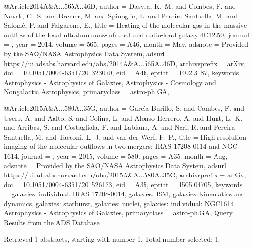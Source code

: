 \documentclass[longauth]{aa}
\begin{document}
{{{{@Article{2014A&A...565A..46D,
  author        = {{Dasyra}, K.~M. and {Combes}, F. and {Novak}, G.~S. and {Bremer}, M. and {Spinoglio}, L. and {Pereira Santaella}, M. and {Salom{\'e}}, P. and {Falgarone}, E.},
  title         = {Heating of the molecular gas in the massive outflow of the local ultraluminous-infrared and radio-loud galaxy 4C12.50},
  journal       = {\aap},
  year          = {2014},
  volume        = {565},
  pages         = {A46},
  month         = {May},
  adsnote       = {Provided by the SAO/NASA Astrophysics Data System},
  adsurl        = {https://ui.adsabs.harvard.edu/abs/2014A&A...565A..46D},
  archiveprefix = {arXiv},
  doi           = {10.1051/0004-6361/201323070},
  eid           = {A46},
  eprint        = {1402.3187},
  keywords      = {Astrophysics - Astrophysics of Galaxies, Astrophysics - Cosmology and Nongalactic Astrophysics},
  primaryclass  = {astro-ph.GA},
}

@Article{2015A&A...580A..35G,
  author        = {{Garc{\'\i}a-Burillo}, S. and {Combes}, F. and {Usero}, A. and {Aalto}, S. and {Colina}, L. and {Alonso-Herrero}, A. and {Hunt}, L.~K. and {Arribas}, S. and {Costagliola}, F. and {Labiano}, A. and {Neri}, R. and {Pereira-Santaella}, M. and {Tacconi}, L.~J. and {van der Werf}, P.~P.},
  title         = {High-resolution imaging of the molecular outflows in two mergers: IRAS 17208-0014 and NGC 1614},
  journal       = {\aap},
  year          = {2015},
  volume        = {580},
  pages         = {A35},
  month         = {Aug},
  adsnote       = {Provided by the SAO/NASA Astrophysics Data System},
  adsurl        = {https://ui.adsabs.harvard.edu/abs/2015A&A...580A..35G},
  archiveprefix = {arXiv},
  doi           = {10.1051/0004-6361/201526133},
  eid           = {A35},
  eprint        = {1505.04705},
  keywords      = {galaxies: individual: IRAS 17208-0014, galaxies: ISM, galaxies: kinematics and dynamics, galaxies: starburst, galaxies: nuclei, galaxies: individual: NGC1614, Astrophysics - Astrophysics of Galaxies},
  primaryclass  = {astro-ph.GA},
}
Query Results from the ADS Database


Retrieved 1 abstracts, starting with number 1.  Total number selected: 1.

}}}}
\end{document}
